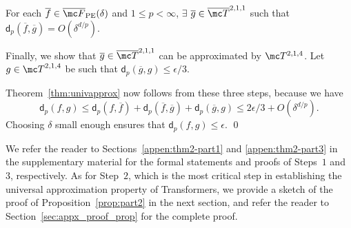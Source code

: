 \documentclass{article} %
\newcommand{\relu}{{\rm ReLU}}
\newcommand{\funcdist}{\mathsf{d}}
\begin{document}
\begin{proposition}
\label{prop:part2}
For each $\overline f \in \overline {\mc F}_{\rm PE} (\delta)$ and $1\leq p < \infty$, $\exists$ $\overline g \in \overline {\mc T}^{2,1,1}$ such that $\funcdist_p(\overline f, \overline g) = O(\delta^{d/p})$.
\end{proposition}

\vspace{-2pt}
Finally, we show that $\overline{g} \in \overline {\mc T}^{2,1,1}$ can be approximated by $\mc T^{2, 1, 4}$. Let $g \in {\mc T}^{2,1,4}$ be such that $\funcdist_{p}(\overline{g}, g)\leq \epsilon/3$.



Theorem~\ref{thm:univapprox} now follows from these three steps, because we have
\begin{equation*}
\funcdist_p(f, g) \leq \funcdist_p(f, \overline f) + \funcdist_p(\overline f, \overline g) + \funcdist_p(\overline g,g) \leq {2\epsilon}/{3} + O(\delta^{d/p}).
\end{equation*}
Choosing $\delta$ small enough ensures that $\funcdist_p(f, g) \leq \epsilon$. \qed

We refer the reader to Sections~\ref{appen:thm2-part1} and \ref{appen:thm2-part3} in the supplementary material for the formal statements and proofs of Steps~$1$ and $3$, respectively. As for Step~$2$, which is the most critical step in establishing the universal approximation property of Transformers, we provide a sketch of the proof of Proposition~\ref{prop:part2} in the next section, and refer the reader to Section~\ref{sec:appx_proof_prop} for the complete proof.
\end{document}
